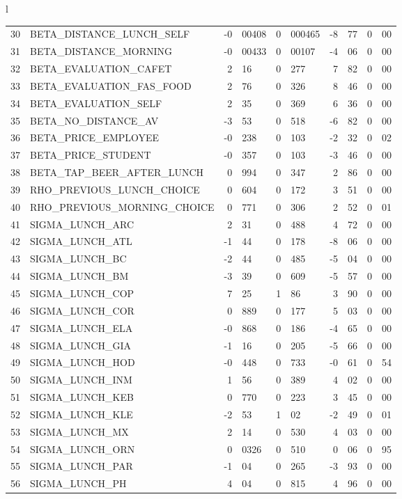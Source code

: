 \begin{tabular}{l}
\begin{tabular}{rlr@{.}lr@{.}lr@{.}lr@{.}l}
30 & BETA_DISTANCE_LUNCH_SELF & -0&00408 & 0&000465 & -8&77 & 0&00\\
31 & BETA_DISTANCE_MORNING & -0&00433 & 0&00107 & -4&06 & 0&00\\
32 & BETA_EVALUATION_CAFET & 2&16 & 0&277 & 7&82 & 0&00\\
33 & BETA_EVALUATION_FAS_FOOD & 2&76 & 0&326 & 8&46 & 0&00\\
34 & BETA_EVALUATION_SELF & 2&35 & 0&369 & 6&36 & 0&00\\
35 & BETA_NO_DISTANCE_AV & -3&53 & 0&518 & -6&82 & 0&00\\
36 & BETA_PRICE_EMPLOYEE & -0&238 & 0&103 & -2&32 & 0&02\\
37 & BETA_PRICE_STUDENT & -0&357 & 0&103 & -3&46 & 0&00\\
38 & BETA_TAP_BEER_AFTER_LUNCH & 0&994 & 0&347 & 2&86 & 0&00\\
39 & RHO_PREVIOUS_LUNCH_CHOICE & 0&604 & 0&172 & 3&51 & 0&00\\
40 & RHO_PREVIOUS_MORNING_CHOICE & 0&771 & 0&306 & 2&52 & 0&01\\
41 & SIGMA_LUNCH_ARC & 2&31 & 0&488 & 4&72 & 0&00\\
42 & SIGMA_LUNCH_ATL  & -1&44 & 0&178 & -8&06 & 0&00\\
43 & SIGMA_LUNCH_BC & -2&44 & 0&485 & -5&04 & 0&00\\
44 & SIGMA_LUNCH_BM & -3&39 & 0&609 & -5&57 & 0&00\\
45 & SIGMA_LUNCH_COP & 7&25 & 1&86 & 3&90 & 0&00\\
46 & SIGMA_LUNCH_COR  & 0&889 & 0&177 & 5&03 & 0&00\\
47 & SIGMA_LUNCH_ELA & -0&868 & 0&186 & -4&65 & 0&00\\
48 & SIGMA_LUNCH_GIA  & -1&16 & 0&205 & -5&66 & 0&00\\
49 & SIGMA_LUNCH_HOD  & -0&448 & 0&733 & -0&61 & 0&54\\
50 & SIGMA_LUNCH_INM  & 1&56 & 0&389 & 4&02 & 0&00\\
51 & SIGMA_LUNCH_KEB  & 0&770 & 0&223 & 3&45 & 0&00\\
52 & SIGMA_LUNCH_KLE & -2&53 & 1&02 & -2&49 & 0&01\\
53 & SIGMA_LUNCH_MX  & 2&14 & 0&530 & 4&03 & 0&00\\
54 & SIGMA_LUNCH_ORN  & 0&0326 & 0&510 & 0&06 & 0&95\\
55 & SIGMA_LUNCH_PAR  & -1&04 & 0&265 & -3&93 & 0&00\\
56 & SIGMA_LUNCH_PH  & 4&04 & 0&815 & 4&96 & 0&00\\

\end{tabular}
\end{tabular}
